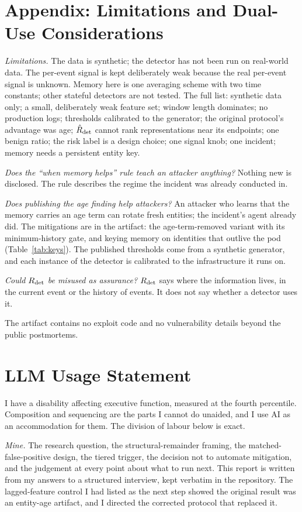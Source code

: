 \documentclass[11pt,letterpaper]{article}
\begin{document}
\section*{Appendix: Limitations and Dual-Use Considerations}
\noindent\textit{Limitations.} The data is synthetic; the detector has not been run on real-world data. The per-event signal is kept deliberately weak because the real per-event signal is unknown. Memory here is one averaging scheme with two time constants; other stateful detectors are not tested. The full list: synthetic data only; a small, deliberately weak feature set; window length dominates; no production logs; thresholds calibrated to the generator; the original protocol's advantage was age; $\hat R_{\rm det}$ cannot rank representations near its endpoints; one benign ratio; the risk label is a design choice; one signal knob; one incident; memory needs a persistent entity key.

\noindent\textit{Does the ``when memory helps'' rule teach an attacker anything?} Nothing new is disclosed. The rule describes the regime the incident was already conducted in.

\noindent\textit{Does publishing the age finding help attackers?} An attacker who learns that the memory carries an age term can rotate fresh entities; the incident's agent already did. The mitigations are in the artifact: the age-term-removed variant with its minimum-history gate, and keying memory on identities that outlive the pod (Table~\ref{tab:keys}). The published thresholds come from a synthetic generator, and each instance of the detector is calibrated to the infrastructure it runs on.

\noindent\textit{Could $R_{\rm det}$ be misused as assurance?} $R_{\rm det}$ says where the information lives, in the current event or the history of events. It does not say whether a detector uses it.

\noindent The artifact contains no exploit code and no vulnerability details beyond the public postmortems.

\section*{LLM Usage Statement}
I have a disability affecting executive function, measured at the fourth percentile. Composition and sequencing are the parts I cannot do unaided, and I use AI as an accommodation for them. The division of labour below is exact.

\noindent\textit{Mine.} The research question, the structural-remainder framing, the matched-false-positive design, the tiered trigger, the decision not to automate mitigation, and the judgement at every point about what to run next. This report is written from my answers to a structured interview, kept verbatim in the repository. The lagged-feature control I had listed as the next step showed the original result was an entity-age artifact, and I directed the corrected protocol that replaced it.
\end{document}

